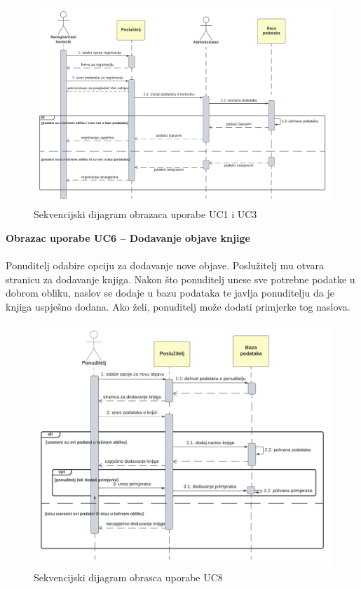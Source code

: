 				\begin{figure}[h]
					\centering
					\includegraphics[width = \textwidth]{slike/sekvUC1UC3.PNG}
					\caption{Sekvencijski dijagram obrazaca uporabe UC1 i UC3}
					\label{fig:enter-label}
				\end{figure}
				\eject
				
				\textbf{Obrazac uporabe UC6 – Dodavanje objave knjige}\\\\
				Ponuditelj odabire opciju za dodavanje nove objave. Poslužitelj mu otvara stranicu za dodavanje knjiga. Nakon što ponuditelj unese sve potrebne podatke u dobrom obliku, naslov se dodaje u bazu podataka te javlja ponuditelju da je knjiga uspješno dodana. Ako želi, ponuditelj može dodati primjerke tog naslova.\\
				
				\begin{figure}[h]
					\centering
					\includegraphics[width = \textwidth]{slike/sekvUC8.PNG}
					\caption{Sekvencijski dijagram obrasca uporabe UC8}
					\label{fig:enter-label}
				\end{figure}
				\eject
				
